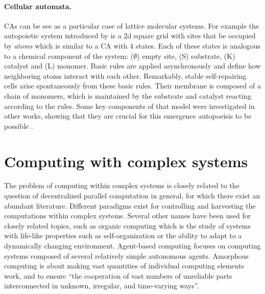 \paragraph{Cellular automata.}
\Acfp{CA} can be see as a particular case of lattice molecular systems. For
example the autopoietic system introduced by
\textcite{varelaAutopoiesisOrganizationLiving1991} is a 2d square grid with
sites that be occupied by \emph{atoms} which is similar to a \ac{CA} with 4
states. Each of these states is analogous to a chemical component of the system:
($\emptyset$) empty site, (S) substrate, (K) catalyst and (L) monomer. Basic rules are
applied asynchronously and define how neighboring atoms interact with each
other. Remarkably, stable self-repairing cells arise spontaneously from these
basic rules. Their membrane is composed of a chain of monomers, which is
maintained by the substrate and catalyst reacting according to the rules. Some
key components of that model were investigated in other works, showing that they
are crucial for this emergence autopoeisis to be possible
\parencite{zelenySelforganizationLivingSystems1977,
  mcmullinRediscoveringComputationalAutopoiesis1997}.

\section{Computing with complex systems}\label{sec:comp-with-compl}

The problem of computing within complex systems is closely related to the
question of decentralized parallel computation in general, for which there exist
an abundant literature. Different paradigms exist for controlling and harvesting
the computations within complex systems. Several other names have been used for
closely related topics, such as organic computing
\parencite{muller-schloerOrganicComputingParadigm2011} which is the study of
systems with life-like properties such as self-organization or the ability to
adapt to a dynamically changing environment. Agent-based computing
\parencite{jenningsAgentBasedComputingPromise1999} focuses on computing systems
composed of several relatively simple autonomous agents. Amorphous computing
\parencite{abelsonAmorphousComputing2000,
  nagpalProgrammablePatternFormationScaleIndependence2008,
  nagpalProgrammableSelfassemblyUsing2002} is about making vast quantities of
individual computing elements work, and to ensure ``the cooperation of vast
numbers of unreliable parts interconnected in unknown, irregular, and
time-varying ways''.

